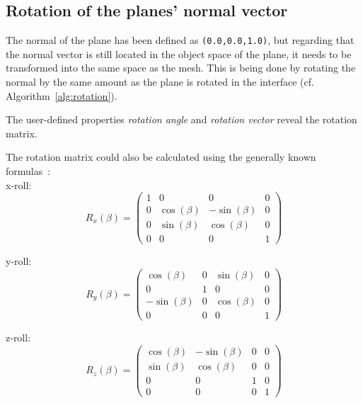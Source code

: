 \subsection{Rotation of the planes' normal vector}
The normal of the plane has been defined as \texttt{(0.0,0.0,1.0)}, but regarding that the normal vector is still located in the object space of the plane, it needs to be transformed into the same space as the mesh. This is being done by rotating the normal by the same amount as the plane is rotated in the interface (cf. Algorithm~\ref{alg:rotation}).
\begin{algorithm}
\;
\BlankLine
\caption{The user-defined properties \emph{rotation angle} and \emph{rotation vector} reveal the rotation matrix.}
\label{alg:rotation}
\end{algorithm}

The rotation matrix could also be calculated using the generally known formulas~\cite{book:computerGraphicsHill}:\\%

x-roll:
\begin{equation}
R_{x}(\beta) = 
\begin{pmatrix} 
	1 & 0 & 0 & 0 \\ 
	0 & \cos(\beta) & -\sin(\beta) & 0 \\ 
	0 & \sin(\beta) & \cos(\beta) & 0 \\ 
	0 & 0 & 0 & 1 
\end{pmatrix}
\end{equation}

y-roll:
\begin{equation}
R_{y}(\beta) =
\begin{pmatrix} 
	\cos(\beta) & 0 & \sin(\beta) & 0 \\
	0 & 1 & 0 & 0 \\
	-\sin(\beta) & 0 & \cos(\beta) & 0 \\
	0 & 0 & 0 & 1
\end{pmatrix}
\end{equation}

z-roll:
\begin{equation}
R_{z}(\beta) =
\begin{pmatrix} 
	\cos(\beta) & -\sin(\beta) & 0 & 0 \\
	\sin(\beta) & \cos(\beta) & 0 & 0 \\
	0 & 0 & 1 & 0 \\
	0 & 0 & 0 & 1
\end{pmatrix}
\end{equation}

